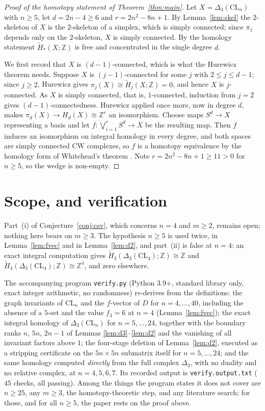 \documentclass[11pt]{amsart}
\theoremstyle{definition}
\newcommand{\CL}{\mathrm{CL}}
\newcommand{\Dl}{\Delta}
\newcommand{\Zm}{\mathbb{Z}}
\begin{document}
\begin{proof}[Proof of the homotopy statement of Theorem~\ref{thm:main}]
Let $X=\Dl_3(\CL_n)$ with $n\ge5$, let $d=2n-4\ge6$ and $r=2n^2-8n+1$. By Lemma~\ref{lem:skel} the
$2$-skeleton of $X$ is the $2$-skeleton of a simplex, which is simply connected; since $\pi_1$
depends only on the $2$-skeleton, $X$ is simply connected. By the homology statement
$\widetilde H_*(X;\Zm)$ is free and concentrated in the single degree $d$.

We first record that $X$ is $(d-1)$-connected, which is what the Hurewicz theorem needs. Suppose
$X$ is $(j-1)$-connected for some $j$ with $2\le j\le d-1$; since $j\ge2$, Hurewicz gives
$\pi_j(X)\cong\widetilde H_j(X;\Zm)=0$, and hence $X$ is $j$-connected. As $X$ is simply connected,
that is, $1$-connected, induction from $j=2$ gives $(d-1)$-connectedness. Hurewicz applied once more,
now in degree $d$, makes $\pi_d(X)\to H_d(X)\cong\Zm^{r}$ an isomorphism. Choose maps $S^{d}\to X$
representing a basis and let $f:\bigvee_{i=1}^{r}S^{d}\to X$ be the resulting map. Then $f$ induces an
isomorphism on integral homology in every degree, and both spaces are simply connected CW complexes,
so $f$ is a homotopy equivalence by the homology form of Whitehead's theorem \cite{Hatcher}. Note
$r=2n^2-8n+1\ge11>0$ for $n\ge5$, so the wedge is non-empty.
\end{proof}

\section{Scope, and verification}\label{sec:verify}

Part~(i) of Conjecture~\ref{conj:csv}, which concerns $n=4$ and $m\ge2$, remains open; nothing here
bears on $m\ge3$. The hypothesis $n\ge5$ is used twice, in Lemma~\ref{lem:fvec} and in
Lemma~\ref{lem:d2}, and part~(ii) is false at $n=4$: an exact integral computation gives
$\widetilde H_3(\Dl_3(\CL_4);\Zm)\cong\Zm$ and $\widetilde H_4(\Dl_3(\CL_4);\Zm)\cong\Zm^{4}$, and
zero elsewhere.

The accompanying program \texttt{verify.py} (Python 3.9+, standard library only, exact integer
arithmetic, no randomness) re-derives from the definitions: the graph invariants of $\CL_n$ and the
$f$-vector of $D$ for $n=4,\dots,40$, including the absence of a $5$-set and the value $f_3=6$ at
$n=4$ (Lemma~\ref{lem:fvec}); the exact integral homology of $\Dl_3(\CL_n)$ for $n=5,\dots,24$,
together with the boundary ranks $n$, $5n$, $2n-1$ of Lemmas \ref{lem:d3}--\ref{lem:d2} and the
vanishing of all invariant factors above $1$; the four-stage deletion of Lemma~\ref{lem:d2},
executed as a stripping certificate on the $5n\times5n$ submatrix itself for $n=5,\dots,24$; and the
same homology computed \emph{directly} from the full complex $\Dl_3$, with no duality and no relative
complex, at $n=4,5,6,7$. Its recorded output is \texttt{verify.output.txt} ($45$ checks, all
passing). Among the things the program states it does not cover are $n\ge25$, any $m\ge3$, the
homotopy-theoretic step, and any literature search; for those, and for all $n\ge5$, the paper rests
on the proof above.
\end{document}

